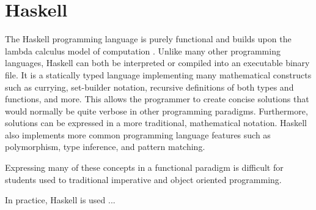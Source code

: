 \section{Haskell}
The Haskell programming language is purely functional\cite{} and builds upon the lambda calculus model of computation \cite{}.
Unlike many other programming languages, Haskell can both be interpreted or compiled into an executable binary file.
It is a statically typed language implementing many mathematical constructs such as currying, set-builder notation, recursive definitions of both types and functions, and more.
This allows the programmer to create concise solutions that would normally be quite verbose in other programming paradigms.  
Furthermore, solutions can be expressed in a more traditional, mathematical notation.
Haskell also implements more common programming language features such as polymorphism, type inference, and pattern matching.

Expressing many of these concepts in a functional paradigm is difficult for students used to traditional imperative and object oriented programming.


In practice, Haskell is used ...  

